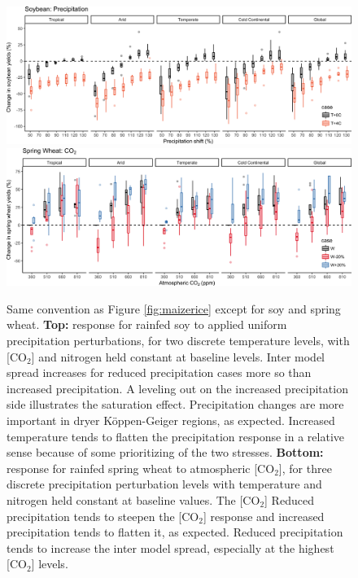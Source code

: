 \documentclass[gmd, manuscript]{copernicus} %
\begin{document}
\begin{figure}[ht]
\centering
	\includegraphics[width=15cm]{figures/soy_sim_CG_W.png}
	\includegraphics[width=15cm]{figures/swh_sim_CG_C.png}
	\caption{Same convention as Figure \ref{fig:maizerice} except for soy and spring wheat. 
	\textbf{Top:} response for rainfed soy to applied uniform precipitation perturbations, for two discrete temperature levels, with [CO$_2$] and nitrogen held constant at baseline levels. Inter model spread increases for reduced precipitation cases more so than increased precipitation. A leveling out on the increased precipitation side illustrates the saturation effect. Precipitation changes are more important in dryer K\"{o}ppen-Geiger regions, as expected.   Increased temperature tends to flatten the precipitation response in a relative sense because of some prioritizing of the two stresses. 
	\textbf{Bottom:} response for rainfed spring wheat to atmospheric [CO$_2$], for three discrete precipitation perturbation levels with temperature and nitrogen held constant at baseline values.
	The [CO$_2$] 
	Reduced precipitation tends to steepen the [CO$_2$] response and increased precipitation tends to flatten it, as expected. Reduced precipitation tends to increase the inter model spread, especially at the highest [CO$_2$] levels.
   }
   \label{fig:soywheat}
\end{figure}
\end{document}
